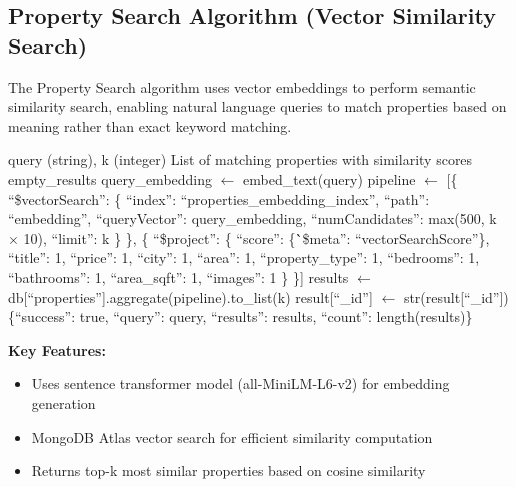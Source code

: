\subsection{Property Search Algorithm (Vector Similarity Search)}

The Property Search algorithm uses vector embeddings to perform semantic similarity search, enabling natural language queries to match properties based on meaning rather than exact keyword matching.

\begin{algorithm}[H]
\caption{Property Vector Similarity Search}
\label{alg:property_search}
\begin{algorithmic}[1]
\REQUIRE query (string), k (integer) 
\ENSURE List of matching properties with similarity scores
    \RETURN empty\_results
\ENDIF
\STATE {}
\STATE query\_embedding $\leftarrow$ embed\_text(query)
\STATE
\STATE {}
\STATE pipeline $\leftarrow$ [\{
\STATE \quad ``\$vectorSearch'': \{
\STATE \quad \quad ``index'': ``properties\_embedding\_index'',
\STATE \quad \quad ``path'': ``embedding'',
\STATE \quad \quad ``queryVector'': query\_embedding,
\STATE \quad \quad ``numCandidates'': max(500, k $\times$ 10),
\STATE \quad \quad ``limit'': k
\STATE \quad \}
\STATE \}, \{
\STATE \quad ``\$project'': \{
\STATE \quad \quad ``score'': \{\``\$meta'': ``vectorSearchScore''\},
\STATE \quad \quad ``title'': 1, ``price'': 1, ``city'': 1, ``area'': 1,
\STATE \quad \quad ``property\_type'': 1, ``bedrooms'': 1, ``bathrooms'': 1,
\STATE \quad \quad ``area\_sqft'': 1, ``images'': 1
\STATE \quad \}
\STATE \}]
\STATE
\STATE {}
\STATE results $\leftarrow$ db[``properties''].aggregate(pipeline).to\_list(k)
\STATE
\STATE {}
    \STATE result[``\_id''] $\leftarrow$ str(result[``\_id''])
\ENDFOR
\RETURN \{``success'': true, ``query'': query, ``results'': results, ``count'': length(results)\}
\end{algorithmic}
\end{algorithm}

\textbf{Key Features:}
\begin{itemize}
    \item Uses sentence transformer model (all-MiniLM-L6-v2) for embedding generation
    \item MongoDB Atlas vector search for efficient similarity computation
    \item Returns top-k most similar properties based on cosine similarity
\end{itemize}

